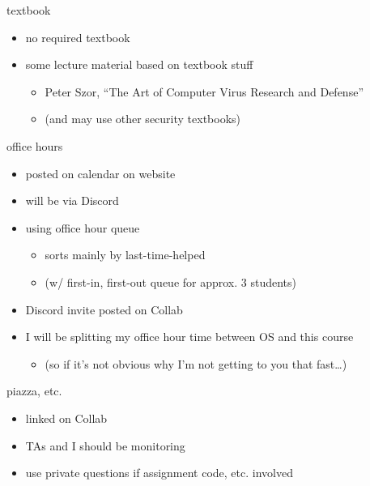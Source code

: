 \begin{frame}{textbook}
\begin{itemize}
    \item no required textbook
    \vspace{.5cm}
    \item some lecture material based on textbook stuff
        \begin{itemize}
        \item Peter Szor, ``The Art of Computer Virus Research and Defense''
        \item (and may use other security textbooks)
        \end{itemize}
    \end{itemize}
\end{frame}

\begin{frame}{office hours}
    \begin{itemize}
    \item posted on calendar on website
    \vspace{.5cm}
    \item will be via Discord
    \item using office hour queue
        \begin{itemize}
        \item sorts mainly by last-time-helped
        \item (w/ first-in, first-out queue for approx. 3 students)
        \end{itemize}
    \item Discord invite posted on Collab
    \vspace{.5cm}
    \item I will be splitting my office hour time between OS and this course
        \begin{itemize}
        \item (so if it's not obvious why I'm not getting to you that fast\ldots)
        \end{itemize}
    \end{itemize}
\end{frame}

\begin{frame}{piazza, etc.}
    \begin{itemize}
    \item linked on Collab
    \item TAs and I should be monitoring
    \vspace{.5cm}
    \item use private questions if assignment code, etc. involved
    \end{itemize}
\end{frame}
